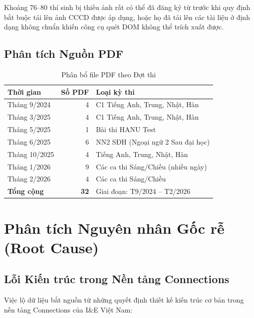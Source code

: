 \documentclass[12pt,a4paper]{article}
\begin{document}
\noindent Khoảng 76--80 thí sinh bị thiếu ảnh rất có thể đã đăng ký từ trước khi quy định bắt buộc tải lên ảnh CCCD được áp dụng, hoặc họ đã tải lên các tài liệu ở định dạng không chuẩn khiến công cụ quét DOM không thể trích xuất được.

\subsection{Phân tích Nguồn PDF}

\begin{table}[H]
\centering
\caption{Phân bổ file PDF theo Đợt thi}
\begin{tabular}{@{}lrl@{}}
\toprule
\textbf{Thời gian} & \textbf{Số PDF} & \textbf{Loại kỳ thi} \\
\midrule
Tháng 9/2024 & 4 & C1 Tiếng Anh, Trung, Nhật, Hàn \\
Tháng 3/2025 & 4 & C1 Tiếng Anh, Trung, Nhật, Hàn \\
Tháng 5/2025 & 1 & Bài thi HANU Test \\
Tháng 6/2025 & 6 & NN2 SĐH (Ngoại ngữ 2 Sau đại học) \\
Tháng 10/2025 & 4 & Tiếng Anh, Trung, Nhật, Hàn \\
Tháng 1/2026 & 9 & Các ca thi Sáng/Chiều (nhiều ngày) \\
Tháng 2/2026 & 4 & Các ca thi Sáng/Chiều \\
\midrule
\textbf{Tổng cộng} & \textbf{32} & Giai đoạn: T9/2024 -- T2/2026 \\
\bottomrule
\end{tabular}
\end{table}

\section{Phân tích Nguyên nhân Gốc rễ (Root Cause)}
\label{sec:rootcause}

\subsection{Lỗi Kiến trúc trong Nền tảng Connections}

Việc lộ dữ liệu bắt nguồn từ những quyết định thiết kế kiến trúc cơ bản trong nền tảng Connections của I\&E Việt Nam:
\end{document}
